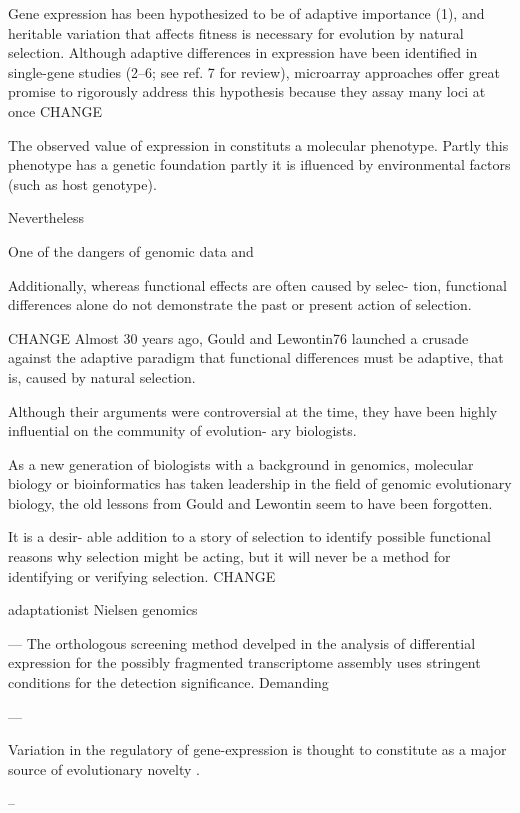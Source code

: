 Gene expression has been hypothesized to be of adaptive importance
(1), and heritable variation that affects fitness is necessary for
evolution by natural selection. Although adaptive differences in
expression have been identified in single-gene studies (2–6; see
ref. 7 for review), microarray approaches offer great promise to
rigorously address this hypothesis because they assay many loci at
once CHANGE


The observed value of expression in constituts a molecular
phenotype. Partly this phenotype has a genetic foundation partly it is
ifluenced by environmental factors (such as host genotype).


Nevertheless

One of the dangers of genomic data and 

Additionally, whereas functional effects are often caused by selec-
tion, functional differences alone do not demonstrate the past or
present action of selection.

CHANGE
Almost 30 years ago, Gould and Lewontin76 launched a crusade against
the adaptive paradigm that functional differences must be adaptive,
that is, caused by natural selection. 

Although their arguments were controversial at the time, they have
been highly influential on the community of evolution- ary biologists.

As a new generation of biologists with a background in genomics,
molecular biology or bioinformatics has taken leadership in the field
of genomic evolutionary biology, the old lessons from Gould and
Lewontin seem to have been forgotten. 

It is a desir- able addition to a story of selection to identify
possible functional reasons why selection might be acting, but it will
never be a method for identifying or verifying selection.  CHANGE

adaptationist \cite{gould_spandrels_1979} Nielsen genomics
\cite{pmid19744124}



---
The orthologous screening method develped in the analysis of
differential expression for the possibly fragmented transcriptome
assembly uses stringent conditions for the detection
significance. Demanding

---

Variation in the regulatory of gene-expression is thought to
constitute as a major source of evolutionary novelty
\cite{pmid11341673}.


--


